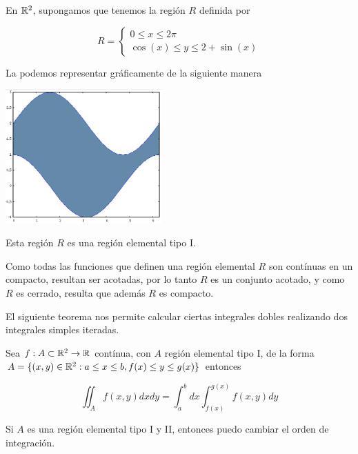 \begin{example}
En $\mathbb{R}^2$, supongamos que tenemos la región $R$ definida por

$$ R = \begin{cases} 0 \leq x \leq 2\pi \\ \cos(x) \leq y \leq 2 + \sin(x) \end{cases}$$

La podemos representar gráficamente de la siguiente manera

\begin{center}
\includegraphics[width=6cm]{images/04_analisis2/region_tipo_1.png}
\end{center}

Esta región $R$ es una región elemental tipo I. 
\end{example}

\begin{observation}
Como todas las funciones que definen una región elemental $R$ son contínuas en un compacto, resultan ser acotadas, por lo tanto $R$ es un conjunto acotado, y como $R$ es cerrado, resulta que además $R$ es compacto.
\end{observation}

El siguiente teorema nos permite calcular ciertas integrales dobles realizando dos integrales simples iteradas.

\begin{theorem}[Fubini] 
Sea $f : A \subset \mathbb{R}^2 \to \mathbb{R}$ contínua, con $ A$ región elemental tipo I, de la forma $A = \{(x,y) \in \mathbb{R}^2 : a \leq x \leq b, f(x) \leq y \leq g(x) \}$ entonces

$$ \iint_A f(x,y) dxdy = \int_a^b dx \int_{f(x)}^{g(x)} f(x,y) dy $$
\end{theorem}

\begin{observation}
Si $A$ es una región elemental tipo I y II, entonces puedo cambiar el orden de integración.
\end{observation}

